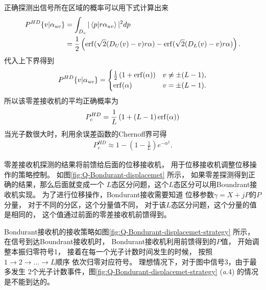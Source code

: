 正确探测出信号所在区域的概率可以用下式计算出来
\begin{equation}
\begin{split}
P^{HD}\{v|\alpha_{uv}\} &= \int_{D_v}|\bra{p}\ket{r\alpha_{uv}}|^2 dp  \\
   &= \frac{1}{2} \left( \erf(\sqrt{2} (D_U(v)-v) r\alpha) -  \erf(\sqrt{2} (D_L(v)-v) r\alpha) \right).
\end{split}
\end{equation}
代入上下界得到
\begin{equation}
\begin{split}
P^{HD}\{v|\alpha_{uv}\} = \begin{cases}
                            \frac{1}{2}\left( 1 + \erf(\alpha) \right)  & v \neq \pm (L-1), \\
                            \erf(\alpha) & v = \pm (L-1).
                          \end{cases}
\end{split}
\end{equation}
所以该零差接收机的平均正确概率为
\begin{equation}
P_c^{HD} = \frac{1}{L}\left(1 + (L-1)\erf(\alpha) \right)
\end{equation}
当光子数很大时，利用余误差函数的Chernoff界\cite{chang2011chernoff}可得
\begin{equation}
\begin{split}
P_c^{HD} \approx 1 - (1-\frac{1}{L}) e^{-\alpha^2}.
\end{split}
\label{eq:QAM-Hybrid-approx-1}
\end{equation}



零差接收机探测的结果将前馈给后面的位移接收机，
用于位移接收机调整位移操作的策略控制。
如图\ref{fig:Q-Bondurant-displacemet} 所示，
如果零差探测得到正确的结果，那么后面就变成一个
$L$态区分问题，这个$L$态区分可以用Boundrant接收机实现。
为了进行位移操作，Bondurant接收需要知道
位移参数$\gamma = X + jP$的$P$分量，
对于不同的分区，这个分量值不同，
对于该$L$态区分问题，这个分量的值是相同的，
这个值通过前面的零差接收机前馈得到。



Bondurant接收机的接收策略如图\ref{fig:Q-Bondurant-displacemet-strategy}  所示，
在信号到达Boundrant接收机时，
Bondurant接收机利用前馈得到的$P$值，
开始调整本振归零符号1，
接着在每一个光子计数时间发生的时候，
按照$1\rightarrow 2 \rightarrow ... \rightarrow L$顺序
依次归零对应符号。
理想情况下，对于图中信号3，由于最多发生
2个光子计数事件，图\ref{fig:Q-Bondurant-displacemet-strategy} (\textit{a}.4)
的情况是不能到达的。

